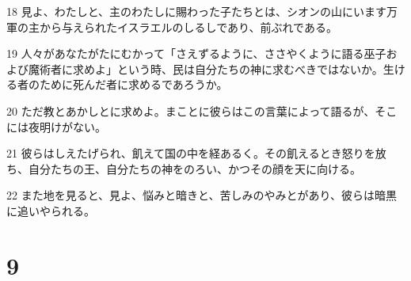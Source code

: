 \par 18 見よ、わたしと、主のわたしに賜わった子たちとは、シオンの山にいます万軍の主から与えられたイスラエルのしるしであり、前ぶれである。
\par 19 人々があなたがたにむかって「さえずるように、ささやくように語る巫子および魔術者に求めよ」という時、民は自分たちの神に求むべきではないか。生ける者のために死んだ者に求めるであろうか。
\par 20 ただ教とあかしとに求めよ。まことに彼らはこの言葉によって語るが、そこには夜明けがない。
\par 21 彼らはしえたげられ、飢えて国の中を経あるく。その飢えるとき怒りを放ち、自分たちの王、自分たちの神をのろい、かつその顔を天に向ける。
\par 22 また地を見ると、見よ、悩みと暗きと、苦しみのやみとがあり、彼らは暗黒に追いやられる。

\chapter{9}

